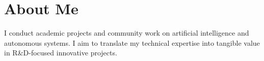 \section{About Me}

I conduct academic projects and community work on artificial intelligence and autonomous systems.
I aim to translate my technical expertise into tangible value in R\&D-focused innovative projects.
